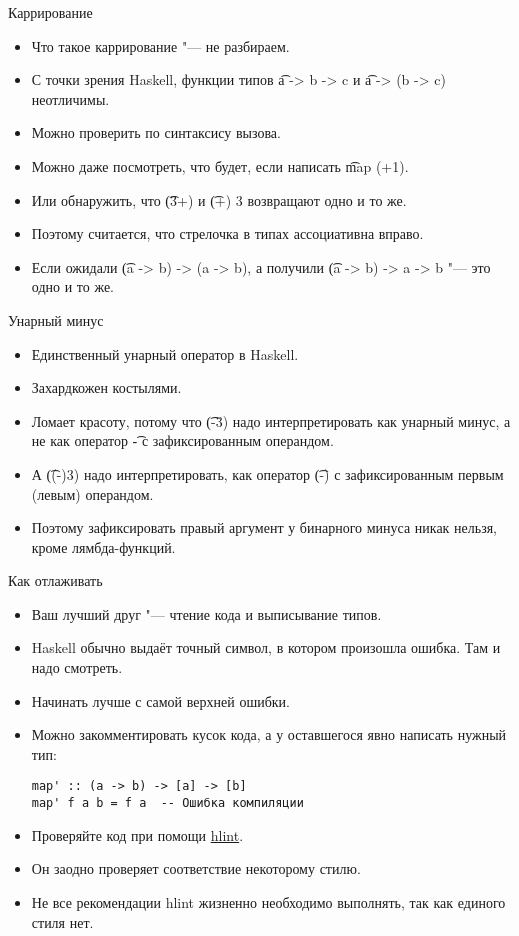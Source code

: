 \begin{frame}{Каррирование}
	\begin{itemize}
		\item Что такое каррирование "--- не разбираем.
		\item С точки зрения Haskell, функции типов \t{a -> b -> c} и \t{a -> (b -> c)} неотличимы.
		\item Можно проверить по синтаксису вызова.
		\item Можно даже посмотреть, что будет, если написать \t{map (+1)}.
		\item Или обнаружить, что \t{(3+)} и \t{(+) 3} возвращают одно и то же.
		\item Поэтому считается, что стрелочка в типах ассоциативна вправо.
		\item Если ожидали \t{(a -> b) -> (a -> b)}, а получили \t{(a -> b) -> a -> b} "--- это одно и то же.
	\end{itemize}
\end{frame}

\begin{frame}{Унарный минус}
	\begin{itemize}
		\item Единственный унарный оператор в Haskell.
		\item Захардкожен костылями.
		\item Ломает красоту, потому что \t{(-3)} надо интерпретировать как унарный минус, а не как оператор \t{-} с зафиксированным операндом.
		\item А \t{((-)3)} надо интерпретировать, как оператор \t{(-)} с зафиксированным первым (левым) операндом.
		\item Поэтому зафиксировать правый аргумент у бинарного минуса никак нельзя, кроме лямбда-функций.
	\end{itemize}
\end{frame}

\begin{frame}[fragile]{Как отлаживать}
	\begin{itemize}
		\item Ваш лучший друг "--- чтение кода и выписывание типов.
		\item Haskell обычно выдаёт точный символ, в котором произошла ошибка. Там и надо смотреть.
		\item Начинать лучше с самой верхней ошибки.
		\item Можно закомментировать кусок кода, а у оставшегося явно написать нужный тип:
\begin{verbatim}
map' :: (a -> b) -> [a] -> [b]
map' f a b = f a  -- Ошибка компиляции
\end{verbatim}
		\item Проверяйте код при помощи \href{https://hackage.haskell.org/package/hlint}{hlint}.
		\item Он заодно проверяет соответствие некоторому стилю.
		\item Не все рекомендации hlint жизненно необходимо выполнять, так как единого стиля нет.
	\end{itemize}
\end{frame}
